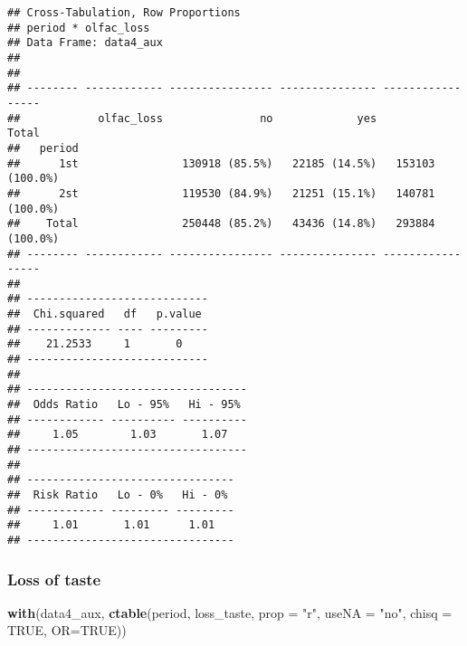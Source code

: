 \documentclass[
]{article}
\newenvironment{Shaded}{\begin{snugshade}}{\end{snugshade}}
\newcommand{\DataTypeTok}[1]{\textcolor[rgb]{0.13,0.29,0.53}{#1}}
\newcommand{\KeywordTok}[1]{\textcolor[rgb]{0.13,0.29,0.53}{\textbf{#1}}}
\newcommand{\NormalTok}[1]{#1}
\newcommand{\OtherTok}[1]{\textcolor[rgb]{0.56,0.35,0.01}{#1}}
\newcommand{\StringTok}[1]{\textcolor[rgb]{0.31,0.60,0.02}{#1}}
\begin{document}
\begin{verbatim}
## Cross-Tabulation, Row Proportions  
## period * olfac_loss  
## Data Frame: data4_aux  
## 
## 
## -------- ------------ ---------------- --------------- -----------------
##            olfac_loss               no             yes             Total
##   period                                                                
##      1st                130918 (85.5%)   22185 (14.5%)   153103 (100.0%)
##      2st                119530 (84.9%)   21251 (15.1%)   140781 (100.0%)
##    Total                250448 (85.2%)   43436 (14.8%)   293884 (100.0%)
## -------- ------------ ---------------- --------------- -----------------
## 
## ----------------------------
##  Chi.squared   df   p.value 
## ------------- ---- ---------
##    21.2533     1       0    
## ----------------------------
## 
## ----------------------------------
##  Odds Ratio   Lo - 95%   Hi - 95% 
## ------------ ---------- ----------
##     1.05        1.03       1.07   
## ----------------------------------
## 
## --------------------------------
##  Risk Ratio   Lo - 0%   Hi - 0% 
## ------------ --------- ---------
##     1.01       1.01      1.01   
## --------------------------------
\end{verbatim}

\hypertarget{loss-of-taste-1}{%
\subsubsection{Loss of taste}\label{loss-of-taste-1}}

\begin{Shaded}
\begin{Highlighting}[]
\KeywordTok{with}\NormalTok{(data4_aux, }\KeywordTok{ctable}\NormalTok{(period, loss_taste, }\DataTypeTok{prop =} \StringTok{"r"}\NormalTok{, }\DataTypeTok{useNA =} \StringTok{"no"}\NormalTok{, }\DataTypeTok{chisq =} \OtherTok{TRUE}\NormalTok{, }\DataTypeTok{OR=}\OtherTok{TRUE}\NormalTok{))}
\end{Highlighting}
\end{Shaded}
\end{document}
